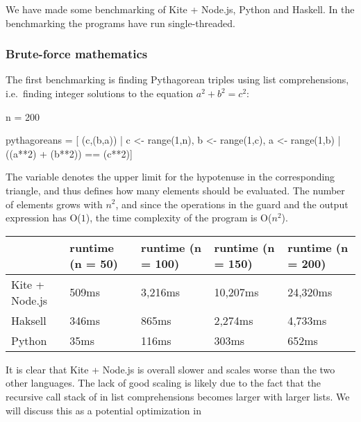We have made some benchmarking of Kite + Node.js, Python and Haskell. In the benchmarking the programs have run single-threaded.

\subsubsection{Brute-force mathematics}
\label{sec:math-benchmark}

The first benchmarking is finding Pythagorean triples using list comprehensions, i.e.\ finding integer solutions to the equation $a^2 + b^2 = c^2$:

\begin{kite}
  
  n = 200

  pythagoreans = [ (c,(b,a)) | c <- range(1,n), b <- range(1,c),
        a <- range(1,b) | ((a**2) + (b**2)) == (c**2)]
\end{kite}

The variable  denotes the upper limit for the hypotenuse in the corresponding triangle, and thus defines how many elements should be evaluated. The number of elements grows with $n^2$, and since the operations in the guard and the output expression has O($1$), the time complexity of the program is O($n^2$).

  \begin{table}[h]
    \centering
    \begin{tabular}{|l|l|l|l|l|}
      \hline 
      & runtime (n = 50) & runtime (n = 100) & runtime (n = 150) & runtime (n = 200) \\

      \hline 
      Kite + Node.js & 509ms            & 3,216ms           & 10,207ms          & 24,320ms          \\
      Haksell        & 346ms            & 865ms             & 2,274ms           & 4,733ms           \\
      Python         & 35ms             & 116ms             & 303ms             & 652ms             \\
      \hline 
    \end{tabular}
  \end{table}

It is clear that Kite + Node.js is overall slower and scales worse than the two other languages. The lack of good scaling is likely due to the fact that the recursive call stack of  in list comprehensions becomes larger with larger lists. We will discuss this as a potential optimization in 

